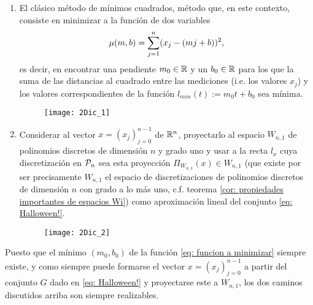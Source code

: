 \begin{enumerate}
\item El clásico método de
mínimos cuadrados, método que, en este contexto,
consiste en minimizar a la función
de dos variables 
\begin{equation}
\label{eq: funcion a minimizar}
\mu (m,b)= \sum\limits_{j=1}^{n}(x_{j}-(mj+b))^{2},
\end{equation}
es decir, en encontrar una pendiente
$m_{0} \in \mathbb{R}$ y un $b_{0} \in \mathbb{R}$ 
para los que la suma de las distancias
al cuadrado entre las mediciones 
(i.e. los valores $x_{j}$)
y los valores correspondientes de la función
$l_{min}(t):=m_{0}t+b_{0}$
sea mínima. 


\begin{figure}[H]
	\centering
	\texttt{[image: 2Dic\_1]} 
\end{figure}	


\item Considerar al vector $x=(x_{j})_{j=0}^{n-1}$
de $\mathbb{R}^{n}$, proyectarlo al espacio $W_{n,1}$ 
de polinomios discretos de dimensión $n$ y grado uno
y usar
a la recta $l_{x}$ cuya discretización en 
$\mathcal{P}_{n}$ sea esta proyección
$\Pi_{W_{n,1}}(x) \in W_{n,1}$ 
(que existe por ser precisamente
$W_{n,1}$ el espacio de discretizaciones
de polinomios discretos de dimensión $n$ con
grado a lo más uno, c.f. 
teorema \ref{cor: propiedades importantes de espacios Wi})
como aproximación lineal del conjunto \eqref{eq: Halloween!}.


\begin{figure}[H]
	\centering
	\texttt{[image: 2Dic\_2]} 
\end{figure}	

\end{enumerate}


Puesto que el mínimo 
$(m_{0}, b_{0})$ de la función 
\eqref{eq: funcion a minimizar} siempre existe,
y como siempre puede formarse el vector
$x=(x_{j})_{j=0}^{n-1}$ a partir del conjunto $G$
dado en \eqref{eq: Halloween!} 
y proyectarse este
a $W_{n,1}$, los dos caminos discutidos arriba
son siempre realizables.


